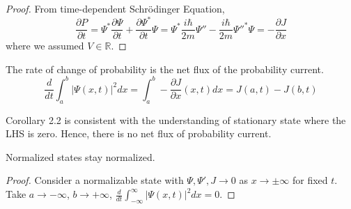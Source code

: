 \documentclass[a4paper]{article}
\begin{document}
\begin{proof}
From time-dependent Schr\"{o}dinger Equation,
$$\frac{\partial P}{\partial t}=\Psi^*\frac{\partial\Psi}{\partial t}+\frac{\partial\Psi^*}{\partial t}\Psi=\Psi^*\frac{i\hbar}{2m}\Psi''-\frac{i\hbar}{2m}\Psi''^*\Psi=-\frac{\partial J}{\partial x}$$
where we assumed $V\in\mathbb{R}$.
\end{proof}
\begin{cor}
The rate of change of probability is the net flux of the probability current.
$$\frac{d}{dt}\int_a^b|\Psi(x,t)|^2dx=\int_a^b-\frac{\partial J}{\partial x}(x,t)dx=J(a,t)-J(b,t)$$
\end{cor}
\begin{remarks}
Corollary 2.2 is consistent with the understanding of stationary state where the LHS is zero. Hence, there is no net flux of probability current.
\end{remarks}
\begin{cor}
Normalized states stay normalized.
\end{cor}
\begin{proof}
Consider a normalizable state with $\Psi,\Psi',J\rightarrow 0$ as $x\rightarrow\pm\infty$ for fixed $t$. Take $a\rightarrow-\infty$, $b\rightarrow+\infty$, $\frac{d}{dt}\int_{-\infty}^\infty|\Psi(x,t)|^2dx=0$.
\end{proof}
\end{document}
